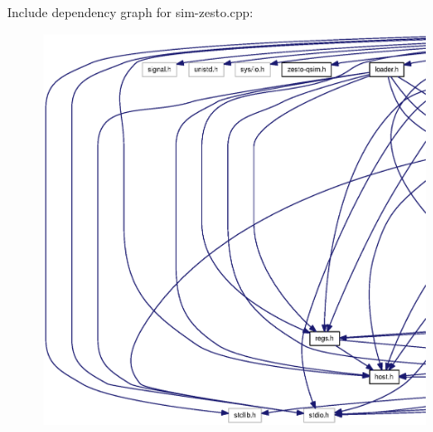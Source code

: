 Include dependency graph for sim-zesto.cpp:\nopagebreak
\begin{figure}[H]
\begin{center}
\leavevmode
\includegraphics[width=420pt]{sim-zesto_8cpp__incl}
\end{center}
\end{figure}
